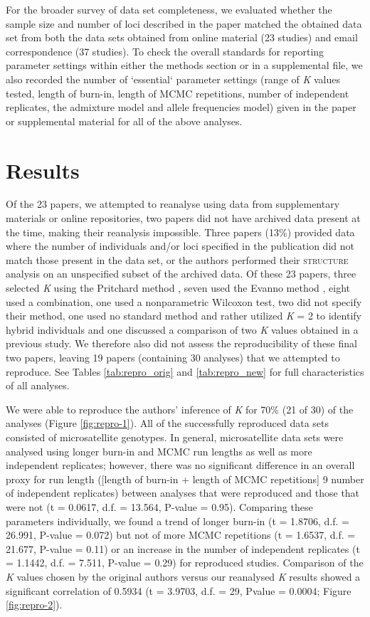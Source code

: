 For the broader survey of data set completeness, we evaluated whether the sample size and number of 
loci described in the paper matched the obtained data set from both the data sets obtained from online 
material (23 studies) and email correspondence (37 studies). To check the overall standards for 
reporting parameter settings within either the methods section or in a supplemental file, we also 
recorded the number of `essential` parameter settings (range of \emph{K} values tested, length of 
burn-in, length of MCMC repetitions, number of independent replicates, the admixture model and 
allele frequencies model) given in the paper or supplemental material for all of the above analyses.

\section{Results}
Of the 23 papers, we attempted to reanalyse using data from supplementary materials or online 
repositories, two papers did not have archived data present at the time, making their reanalysis 
impossible. Three papers (13\%) provided data where the number of individuals and/or loci specified 
in the publication did not match those present in the data set, or the authors performed their 
\textsc{structure} analysis on an unspecified subset of the archived data. Of these 23 papers, 
three selected \emph{K} using the Pritchard method \citep{Pritchard:2000}, seven used the Evanno 
method \citep{Evanno:2005}, eight used a combination, one used a nonparametric Wilcoxon test, 
two did not specify their method, one used no standard method and rather utilized \emph{K} = 2 to 
identify hybrid individuals and one discussed a comparison of two \emph{K} values obtained in a 
previous study. We therefore also did not assess the reproducibility of these final two papers, 
leaving 19 papers (containing 30 analyses) that we attempted to reproduce. See Tables \ref{tab:repro_orig} and \ref{tab:repro_new} for full characteristics of all analyses.

We were able to reproduce the authors' inference of \emph{K} for 70\% (21 of 30) of the analyses 
(Figure \ref{fig:repro-1}). All of the successfully reproduced data sets consisted of microsatellite 
genotypes. In general, microsatellite data sets were analysed using longer burn-in and MCMC run 
lengths as well as more independent replicates; however, there was no significant difference in 
an overall proxy for run length ([length of burn-in + length of MCMC repetitions] 9 number of independent replicates) between 
analyses that were reproduced and those that were not (t = 0.0617, d.f. = 13.564, P-value = 0.95). 
Comparing these parameters individually, we found a trend of longer burn-in (t = 1.8706, d.f. = 26.991, P-value = 0.072) 
but not of more MCMC repetitions (t = 1.6537, d.f. = 21.677, P-value = 0.11) or an increase in the 
number of independent replicates (t = 1.1442, d.f. = 7.511, P-value = 0.29) for reproduced studies. 
Comparison of the \emph{K} values chosen by the original authors versus our reanalysed \emph{K} results 
showed a significant correlation of 0.5934 (t = 3.9703, d.f. = 29, Pvalue = 0.0004; Figure \ref{fig:repro-2}).

